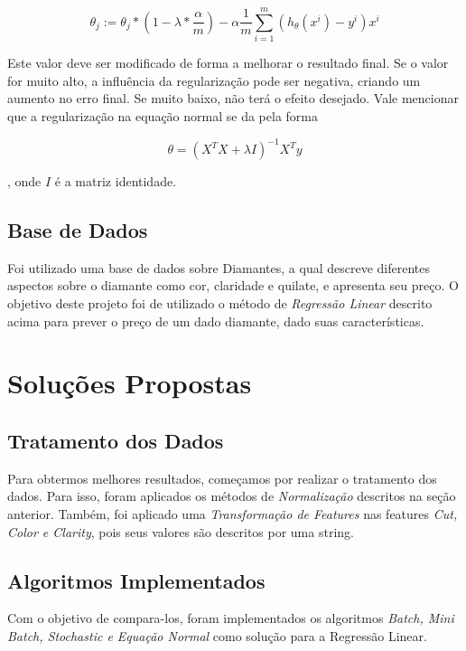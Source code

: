 \documentclass[conference]{IEEEtran}
\begin{document}
\begin{equation} \label{eq:regularization}
\theta_{j} := \theta_{j} * (1 - \lambda * \dfrac{\alpha}{m}) - \alpha \dfrac{1}{m} \sum_{i=1}^{m}(h_{\theta}(x^{i}) - y^{i}) x^{i}
\end{equation}

Este valor deve ser modificado de forma a melhorar o resultado final. Se o valor for muito alto, a influência da regularização pode ser negativa, criando um aumento no erro final. Se muito baixo, não terá o efeito desejado. Vale mencionar que a regularização na equação normal se da pela forma

\begin{equation} \label{eq:normal_reg}
\theta = (X^{T}X + \lambda I)^{-1}X^{T}y
\end{equation}

, onde $I$ é a matriz identidade.

\subsection{Base de Dados}

Foi utilizado uma base de dados sobre Diamantes, a qual descreve diferentes aspectos sobre o diamante como cor, claridade e quilate, e apresenta seu preço. O objetivo deste projeto foi de utilizado o método de \textit{Regressão Linear} descrito acima para prever o preço de um dado diamante, dado suas características.

\section{Soluções Propostas}

\subsection{Tratamento dos Dados}

Para obtermos melhores resultados, começamos por realizar o tratamento dos dados. Para isso, foram aplicados os métodos de \textit{Normalização} descritos na seção anterior. Também, foi aplicado uma \textit{Transformação de Features} nas features \textit{Cut, Color e Clarity}, pois seus valores são descritos por uma string.

\subsection{Algoritmos Implementados}

Com o objetivo de compara-los, foram implementados os algoritmos \textit{Batch, Mini Batch, Stochastic e Equação Normal} como solução para a Regressão Linear.
\end{document}
